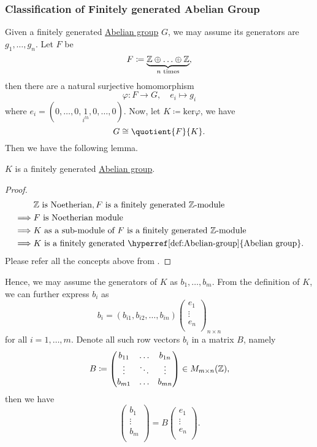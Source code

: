 \subsubsection{Classification of Finitely generated Abelian Group}
Given a finitely generated \hyperref[def:Abelian-group]{Abelian group} \(G\), we may assume its generators are \(g_1, \ldots , g_n \). Let \(F\) be
\[
	F\coloneqq \underbrace{\mathbb{\MakeUppercase{z}} \oplus \ldots \oplus \mathbb{\MakeUppercase{z}}  }_{n \text{ times}},
\]
then there are a natural surjective homomorphism
\[
	\varphi \colon F\to G,\quad e_{i} \mapsto g_{i}
\]
where \(e_{i} = (0, \ldots , 0, \underset{i^{th} }{1}, 0, \ldots , 0  )\). Now, let \(K\coloneqq \mathrm{ker}\varphi  \), we have
\[
	G \cong \quotient{F}{K}.
\]
Then we have the following lemma.
\begin{lemma}
	\(K\) is a finitely generated \hyperref[def:Abelian-group]{Abelian group}.
\end{lemma}
\begin{proof}
	\[
		\begin{split}
			&\mathbb{\MakeUppercase{z}} \text{ is Noetherian}, F \text{ is a finitely generated \(\mathbb{Z}\)-module }  \\
			\implies &F \text{ is Noetherian module}\\
			\implies &\text{\(K\) as a sub-module of \(F\) is a finitely generated \(\mathbb{Z}\)-module } \\
			\implies &\text{\(K\) is a finitely generated \hyperref[def:Abelian-group]{Abelian group}}.
		\end{split}
	\]
	Please refer all the concepts above from \cite{atiyah1994introduction}.
\end{proof}

Hence, we may assume the generators of \(K\) as \(b_1, \ldots , b_{m}\). From the definition of \(K\), we can further express \(b_{i}\) as
\[
	b_{i} = (b_{i1}, b_{i2}, \ldots , b_{in})\begin{pmatrix}
		e_{1}  \\
		\vdots \\
		e_{n}  \\
	\end{pmatrix}_{n \times n}
\]
for all \(i = 1, \ldots , m \). Denote all such row vectors \(b_{i} \) in a matrix \(B\), namely
\[
	B \coloneqq \begin{pmatrix}
		b_{11} & \ldots & b_{1n} \\
		\vdots & \ddots & \vdots \\
		b_{m1} & \ldots & b_{mn} \\
	\end{pmatrix}\in M_{m\times n} ({\mathbb{\MakeUppercase{z}} }),
\]
then we have
\[
	\begin{pmatrix}
		b_1    \\
		\vdots \\
		b_m    \\
	\end{pmatrix} = B\begin{pmatrix}
		e_{1}  \\
		\vdots \\
		e_{n}  \\
	\end{pmatrix}.
\]

